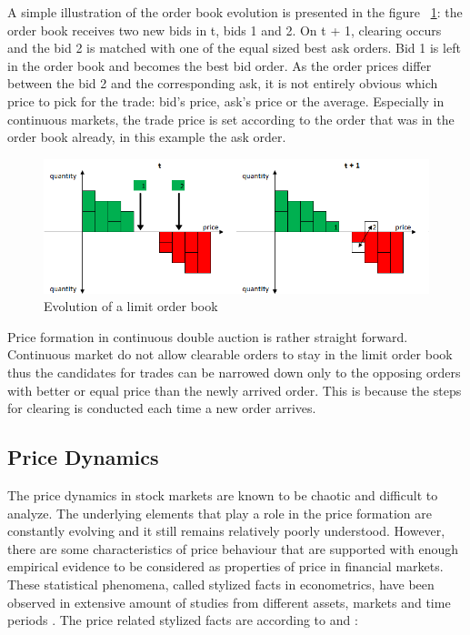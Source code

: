 A simple illustration of the order book evolution is presented
in the figure ~\ref{fig:lob_evo}: the order book receives two new bids in t, bids 1 and 2.
On t + 1, clearing occurs and the bid 2 is matched with one of the equal sized best ask orders.
Bid 1 is left in the order book and becomes the best bid order. As the order prices differ
between the bid 2 and the corresponding ask, it is not entirely obvious which price to pick
for the trade: bid's price, ask's price or the average. Especially in continuous markets,
the trade price is set according to the order that was in the order book already, in this
example the ask order. %

\begin{figure}
    \begin{center}  
        \includegraphics[width=15cm]{diagrams/lob_evolution.png}
        \caption{Evolution of a limit order book}
        \label{fig:lob_evo}
    \end{center}
\end{figure}

Price formation in continuous double auction is rather straight forward. Continuous
market do not allow clearable orders to stay in the limit order book thus the
candidates for trades can be narrowed down only to the opposing orders with better
or equal price than the newly arrived order. This is because the steps for 
clearing is conducted each time a new order arrives.





\subsection{Price Dynamics}
The price dynamics in stock markets are known to be chaotic and difficult to 
analyze. The underlying elements that play a role in the price formation
are constantly evolving and it still remains relatively poorly understood.
However, there are some characteristics of price behaviour that are supported
with enough empirical evidence to be considered as properties of price in
financial markets. These statistical phenomena, called stylized facts in
econometrics, have been observed in extensive amount of studies from 
different assets, markets and time periods \citep{Shakeel18}. 
The price related stylized facts are according to \citet{StylizedFacts01} and \citet{lob13}:

